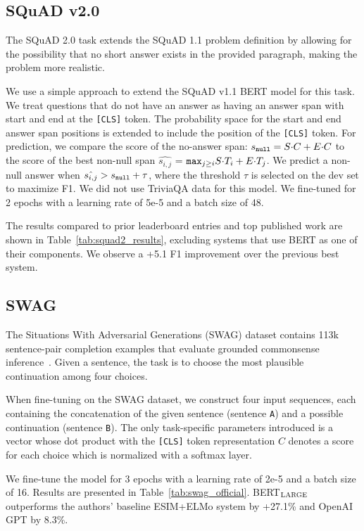 \documentclass[11pt,a4paper]{article}
\newcommand\bertlarge{BERT$_{\small \textsc{LARGE}}$\xspace}
\begin{document}
\subsection{SQuAD v2.0}

The SQuAD 2.0 task extends the SQuAD 1.1 problem definition by allowing for the possibility that no short answer exists in the provided paragraph, making the problem more realistic.

We use a simple approach to extend the SQuAD v1.1 BERT model for this task. We treat questions that do not have an answer as having an answer span with start and end at the {\tt [CLS]} token. The probability space for the start and end answer span positions is extended to include the position of the {\tt [CLS]} token. For prediction, we compare the score of the no-answer span: $s_{\tt null} = S{\cdot}C + E{\cdot}C$ to the score of the best non-null span $\hat{s_{i,j}}$ =  $ {\tt max}_{j \geq i} S{\cdot}T_i + E{\cdot}T_j$. We predict a non-null answer when  $\hat{s_{i,j}} > s_{\tt null} + \tau $, where the threshold $\tau$ is selected on the dev set to maximize F1. We did not use TriviaQA data for this model. We fine-tuned for 2 epochs with a learning rate of 5e-5 and a batch size of 48.

The results compared to prior leaderboard entries and top published work \cite{unet,slqa} are shown in Table~\ref{tab:squad2_results}, excluding systems that use BERT as one of their components. We observe a +5.1 F1 improvement over the previous best system.

\subsection{SWAG}
\label{sec:swag}
The Situations With Adversarial Generations (SWAG) dataset contains 113k sentence-pair completion examples that evaluate grounded commonsense inference~\cite{zellers2018swag}. Given a sentence, the task is to choose the most plausible continuation among four choices.

When fine-tuning on the SWAG dataset, we construct four input sequences, each containing the concatenation of the given sentence (sentence {\tt A}) and a possible continuation (sentence {\tt B}). The only task-specific parameters introduced is a vector whose dot product with the {\tt [CLS]} token representation $C$ denotes a score for each choice which is normalized with a softmax layer.

We fine-tune the model for 3 epochs with a learning rate of 2e-5 and a batch size of 16. Results are presented in Table~\ref{tab:swag_official}. \bertlarge outperforms the authors' baseline ESIM+ELMo system by +27.1\% and OpenAI GPT by 8.3\%.
\end{document}
